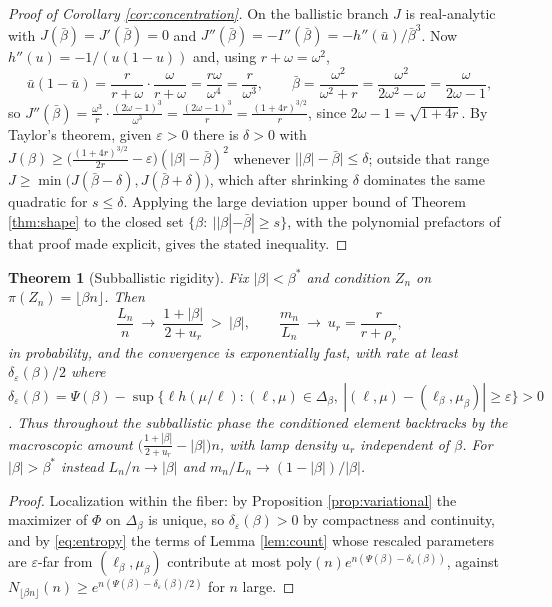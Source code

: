 \documentclass[11pt]{amsart}
\newtheorem{theorem}{Theorem}[section]
\theoremstyle{definition}
\theoremstyle{remark}
\begin{document}
\begin{proof}[Proof of Corollary \ref{cor:concentration}]
On the ballistic branch $J$ is real-analytic with $J(\bar\beta)=J'(\bar\beta)=0$ and $J''(\bar\beta)=-I''(\bar\beta)=-h''(\bar u)/\bar\beta^{3}$. Now $h''(u)=-1/(u(1-u))$ and, using $r+\omega=\omega^{2}$,
\[
\bar u(1-\bar u)=\frac{r}{r+\omega}\cdot\frac{\omega}{r+\omega}=\frac{r\omega}{\omega^{4}}=\frac r{\omega^{3}},
\qquad
\bar\beta=\frac{\omega^{2}}{\omega^{2}+r}=\frac{\omega^{2}}{2\omega^{2}-\omega}=\frac{\omega}{2\omega-1},
\]
so $J''(\bar\beta)=\frac{\omega^{3}}{r}\cdot\frac{(2\omega-1)^{3}}{\omega^{3}}=\frac{(2\omega-1)^{3}}r=\frac{(1+4r)^{3/2}}r$, since $2\omega-1=\sqrt{1+4r}$. By Taylor's theorem, given $\varepsilon>0$ there is $\delta>0$ with $J(\beta)\ge\big(\tfrac{(1+4r)^{3/2}}{2r}-\varepsilon\big)(|\beta|-\bar\beta)^{2}$ whenever $\big||\beta|-\bar\beta\big|\le\delta$; outside that range $J\ge\min\big(J(\bar\beta-\delta),J(\bar\beta+\delta)\big)$, which after shrinking $\delta$ dominates the same quadratic for $s\le\delta$. Applying the large deviation upper bound of Theorem \ref{thm:shape} to the closed set $\{\beta:\ ||\beta|-\bar\beta|\ge s\}$, with the polynomial prefactors of that proof made explicit, gives the stated inequality.
\end{proof}

\begin{theorem}[Subballistic rigidity]\label{thm:rigidity}
Fix $|\beta|<\beta^{*}$ and condition $Z_n$ on $\pi(Z_n)=\lfloor\beta n\rfloor$. Then
\[
\frac{L_n}{n}\ \longrightarrow\ \frac{1+|\beta|}{2+u_r}\ >\ |\beta|,
\qquad
\frac{m_n}{L_n}\ \longrightarrow\ u_r=\frac{r}{r+\rho_r},
\]
in probability, and the convergence is exponentially fast, with rate at least $\delta_\varepsilon(\beta)/2$ where
$\delta_\varepsilon(\beta)=\Psi(\beta)-\sup\{\ell h(\mu/\ell):(\ell,\mu)\in \Delta_\beta,\ |(\ell,\mu)-(\ell_\beta,\mu_\beta)|\ge\varepsilon\}>0$.
Thus throughout the subballistic phase the conditioned element backtracks by the macroscopic amount $\big(\tfrac{1+|\beta|}{2+u_r}-|\beta|\big)n$, with lamp density $u_r$ independent of $\beta$. For $|\beta|>\beta^{*}$ instead $L_n/n\to|\beta|$ and $m_n/L_n\to(1-|\beta|)/|\beta|$.
\end{theorem}

\begin{proof}
Localization within the fiber: by Proposition \ref{prop:variational} the maximizer of $\Phi$ on $\Delta_\beta$ is unique, so $\delta_\varepsilon(\beta)>0$ by compactness and continuity, and by \eqref{eq:entropy} the terms of Lemma \ref{lem:count} whose rescaled parameters are $\varepsilon$-far from $(\ell_\beta,\mu_\beta)$ contribute at most $\mathrm{poly}(n)e^{n(\Psi(\beta)-\delta_\varepsilon(\beta))}$, against $N_{\lfloor\beta n\rfloor}(n)\ge e^{n(\Psi(\beta)-\delta_\varepsilon(\beta)/2)}$ for $n$ large.
\end{proof}
\end{document}

